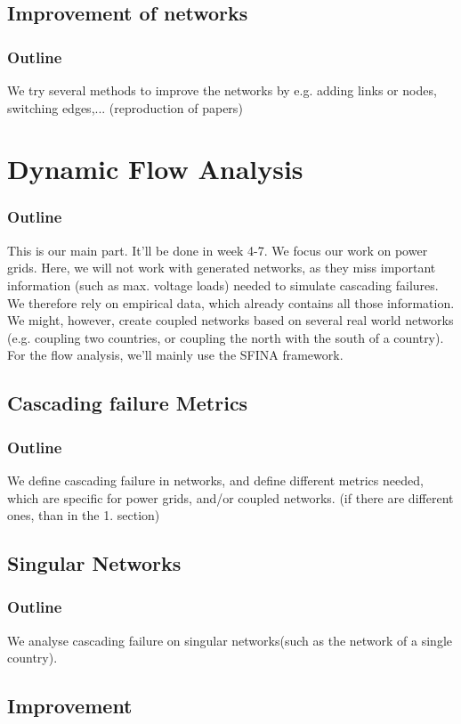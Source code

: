 \documentclass[11pt]{article}
\begin{document}
\subsection{Improvement of networks}
\subsubsection{Outline}
We try several methods to improve the networks by e.g. adding links or nodes, switching edges,... (reproduction of papers)
\section{Dynamic Flow Analysis} %
\subsubsection{Outline}
This is our main part. It'll be done in week 4-7. We focus our work on power grids. Here, we will not work with generated networks, as they miss important information (such as max. voltage loads) needed to simulate cascading failures. We therefore rely on empirical data, which already contains all those information. We might, however, create coupled networks based on several real world networks (e.g. coupling two countries, or coupling the north with the south of a country).
For the flow analysis, we'll mainly use the SFINA framework. 
\subsection{Cascading failure Metrics}
\subsubsection{Outline}
We define cascading failure in networks, and define different metrics needed, which are specific for power grids, and/or coupled networks. (if there are different ones, than in the 1. section)
\subsection{Singular Networks}
\subsubsection{Outline}
We analyse cascading failure on singular networks(such as the network of a single country).
\subsection{Improvement}
\end{document}
